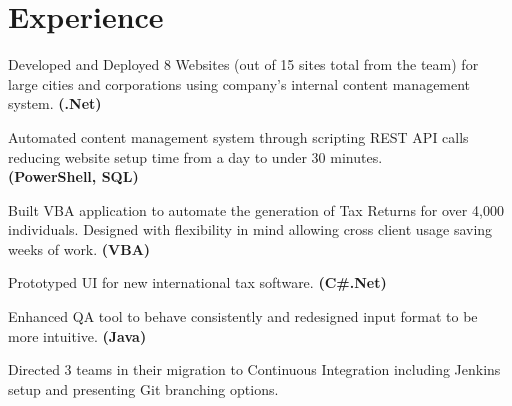 \documentclass[letterpaper]{kevin-resume} %
\begin{document}
\hfill
%
%
\begin{minipage}[t]{0.66\textwidth} %


\section{Experience}

\vspace{\topsep} %
\begin{tightitemize}
	\item Developed and Deployed 8 Websites (out of 15 sites total from the team) for large cities and corporations using company's internal content management system. \textbf{(.Net)}
	\item Automated content management system through scripting REST API calls reducing website setup time from a day to under 30 minutes. \\ \textbf{(PowerShell, SQL)}
\end{tightitemize}

\sectionspace %


\begin{tightitemize}
	\item Built VBA application to automate the generation of Tax Returns for over 4,000 individuals. Designed with flexibility in mind allowing cross client usage saving weeks of work. \textbf{(VBA)}
	\item Prototyped UI for new international tax software. \textbf{(C\#.Net)}
\end{tightitemize}

\sectionspace %


\begin{tightitemize}
	\item Enhanced QA tool to behave consistently and redesigned input format to be more intuitive. \textbf{(Java)}
	\item Directed 3 teams in their migration to Continuous Integration including Jenkins setup and presenting Git branching options.
\end{tightitemize}


\end{minipage}
\end{document}
